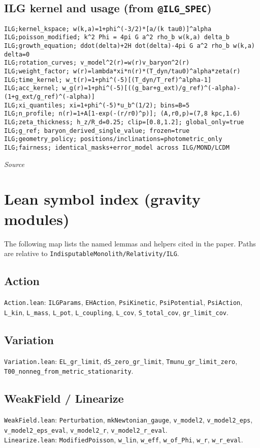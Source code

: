 \documentclass[12pt,a4paper]{article}
\begin{document}
\subsection*{ILG kernel and usage (from \texttt{@ILG\_SPEC})}
\begin{verbatim}
ILG;kernel_kspace; w(k,a)=1+phi^(-3/2)*[a/(k tau0)]^alpha
ILG;poisson_modified; k^2 Phi = 4pi G a^2 rho_b w(k,a) delta_b
ILG;growth_equation; ddot(delta)+2H dot(delta)-4pi G a^2 rho_b w(k,a) delta=0
ILG;rotation_curves; v_model^2(r)=w(r)v_baryon^2(r)
ILG;weight_factor; w(r)=lambda*xi*n(r)*(T_dyn/tau0)^alpha*zeta(r)
ILG;time_kernel; w_t(r)=1+phi^(-5)[(T_dyn/T_ref)^alpha-1]
ILG;acc_kernel; w_g(r)=1+phi^(-5)[((g_bar+g_ext)/g_ref)^(-alpha)-(1+g_ext/g_ref)^(-alpha)]
ILG;xi_quantiles; xi=1+phi^(-5)*u_b^(1/2); bins=B=5
ILG;n_profile; n(r)=1+A[1-exp(-(r/r0)^p)]; (A,r0,p)=(7,8 kpc,1.6)
ILG;zeta_thickness; h_z/R_d=0.25; clip=[0.8,1.2]; global_only=true
ILG;g_ref; baryon_derived_single_value; frozen=true
ILG;geometry_policy; positions/inclinations=photometric_only
ILG;fairness; identical_masks+error_model across ILG/MOND/LCDM
\end{verbatim}
\noindent\emph{Source}

\section{Lean symbol index (gravity modules)}
\label{app:lean-index}
The following map lists the named lemmas and helpers cited in the paper. Paths are relative to \texttt{IndisputableMonolith/Relativity/ILG}.

\subsection*{Action}
\noindent\texttt{Action.lean}: \texttt{ILGParams}, \texttt{EHAction}, \texttt{PsiKinetic}, \texttt{PsiPotential}, \texttt{PsiAction}, \texttt{L\_kin}, \texttt{L\_mass}, \texttt{L\_pot}, \texttt{L\_coupling}, \texttt{L\_cov}, \texttt{S\_total\_cov}, \texttt{gr\_limit\_cov}.

\subsection*{Variation}
\noindent\texttt{Variation.lean}: \texttt{EL\_gr\_limit}, \texttt{dS\_zero\_gr\_limit}, \texttt{Tmunu\_gr\_limit\_zero}, \texttt{T00\_nonneg\_from\_metric\_stationarity}.

\subsection*{WeakField / Linearize}
\noindent\texttt{WeakField.lean}: \texttt{Perturbation}, \texttt{mkNewtonian\_gauge}, \texttt{v\_model2}, \texttt{v\_model2\_eps}, \texttt{v\_model2\_eps\_eval}, \texttt{v\_model2\_r}, \texttt{v\_model2\_r\_eval}.\\
\noindent\texttt{Linearize.lean}: \texttt{ModifiedPoisson}, \texttt{w\_lin}, \texttt{w\_eff}, \texttt{w\_of\_Phi}, \texttt{w\_r}, \texttt{w\_r\_eval}.
\end{document}
